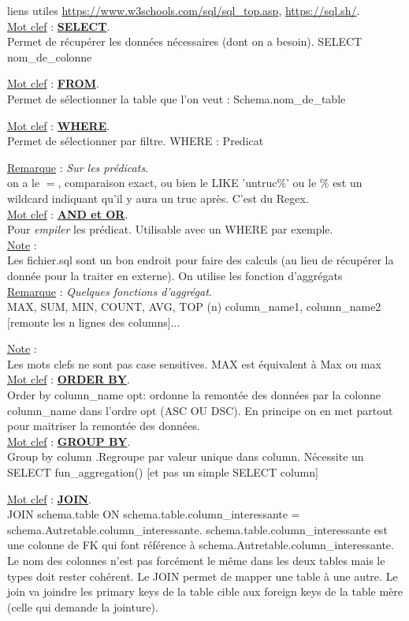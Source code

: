 \documentclass[a4paper,12pt,twoside]{article}
\newcommand{\urlcolor}{magenta}  %
\newcommand{\keycolor}{purple} %
\newcommand{\rem}[2]{\noindent\underline{Remarque} : \textit{#1}.\\ \indent #2}
\newcommand{\note}[1]{\noindent\underline{Note} : \\ \indent #1}
\newcommand{\keyref}[2]{\hypersetup{urlcolor=\keycolor} \href{#1}{\textbf{#2}}\hypersetup{urlcolor=\urlcolor}}
\newcommand{\keyword}[3]{\noindent\underline{Mot clef} : \keyref{#1}{#2}. \\ \indent #3}
\begin{document}
liens utiles \url{https://www.w3schools.com/sql/sql_top.asp}, \url{https://sql.sh/}.\\

\keyword{https://sql.sh/cours/select}{SELECT}{Permet de récupérer les données nécessaires (dont on a besoin). SELECT nom\_de\_colonne}

\keyword{https://sql.sh/cours/select}{FROM}{Permet de sélectionner la table que l'on veut : Schema.nom\_de\_table}

\keyword{https://sql.sh/cours/where}{WHERE}{Permet de sélectionner par filtre. WHERE : Predicat}

\rem{Sur les prédicats}{on a le $=$, comparaison exact, ou bien le LIKE 'untruc\%' ou le \% est un wildcard indiquant qu'il y aura un truc après. C'est du Regex.}\\

\keyword{https://sql.sh/cours/where/and-or}{AND et OR}{Pour \textit{empiler} les prédicat. Utilisable avec un WHERE par exemple.}\\

\note{Les fichier.sql sont un bon endroit pour faire des calculs (au lieu de récupérer la donnée pour la traiter en externe). On utilise les fonction d'aggrégats}\\

\rem{Quelques fonctions d'aggrégat}{MAX, SUM, MIN, COUNT, AVG, TOP (n) column\_name1, column\_name2 [remonte les n lignes des columns]...}

\note{Les mots clefs ne sont pas case sensitives. MAX est équivalent à Max ou max}\\

\keyword{https://sql.sh/cours/order-by}{ORDER BY}{Order by column\_name opt: ordonne la remontée des données par la colonne column\_name dans l'ordre opt (ASC OU DSC). En principe on en met partout pour maitriser la remontée des données.}\\

\keyword{https://sql.sh/cours/group-by}{GROUP BY}{Group by column .Regroupe par valeur unique dans column. Nécessite un SELECT fun\_aggregation() [et pas un simple SELECT column]}

\keyword{https://sql.sh/cours/jointures}{JOIN}{JOIN schema.table ON schema.table.column\_interessante = schema.Autretable.column\_interessante. schema.table.column\_interessante est une colonne de FK qui font référence à schema.Autretable.column\_interessante. Le nom des colonnes n'est pas forcément le même dans les deux tables mais le types doit rester cohérent. Le JOIN permet de mapper une table à une autre. Le join va joindre les primary keys de la table cible aux foreign keys de la table mère (celle qui demande la jointure).} \\
\end{document}
